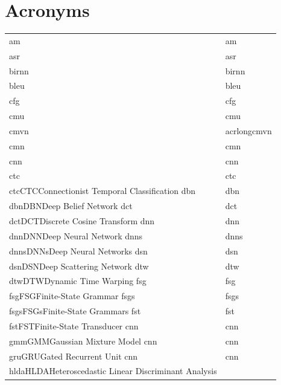\documentclass[12pt,twoside]{report}
\begin{document}
\listoffigures
 
\listoftables
{}
\listofalgorithms
\newpage
{}
\chapter*{Acronyms}
\begin{table}
  \label{tab:acronymns}
\begin{tabular}{ll}
\acrshort{am} & \acrlong{am}  \\
\acrshort{asr} & \acrlong{asr}\\
\acrshort{birnn} & \acrlong{birnn}\\
\acrshort{bleu} & \acrlong{bleu}\\
\acrshort{cfg} & \acrlong{cfg} \\
\acrshort{cmu} & \acrlong{cmu} \\
\acrshort{cmvn} & acrlong{cmvn} \\
\acrshort{cmn} & \acrlong{cmn} \\
\acrshort{cnn} & \acrlong{cnn} \\
\acrshort{ctc} & \acrlong{ctc} \\{ctc}{CTC}{Connectionist Temporal Classification}
\acrshort{dbn} & \acrlong{dbn} \\{dbn}{DBN}{Deep Belief Network}
\acrshort{dct} & \acrlong{dct} \\{dct}{DCT}{Discrete Cosine Transform}
\acrshort{dnn} & \acrlong{dnn} \\{dnn}{DNN}{Deep Neural Network}
\acrshort{dnns} & \acrlong{dnns} \\{dnns}{DNNs}{Deep Neural Networks}
\acrshort{dsn} & \acrlong{dsn} \\{dsn}{DSN}{Deep Scattering Network}
\acrshort{dtw} & \acrlong{dtw} \\{dtw}{DTW}{Dynamic Time Warping}
\acrshort{fsg} & \acrlong{fsg} \\{fsg}{FSG}{Finite-State Grammar}
\acrshort{fsgs} & \acrlong{fsgs} \\{fsgs}{FSGs}{Finite-State Grammars}
\acrshort{fst} & \acrlong{fst} \\{fst}{FST}{Finite-State Transducer}
\acrshort{cnn} & \acrlong{cnn} \\{gmm}{GMM}{Gaussian Mixture Model}
\acrshort{cnn} & \acrlong{cnn} \\{gru}{GRU}{Gated Recurrent Unit}
\acrshort{cnn} & \acrlong{cnn} \\{hlda}{HLDA}{Heteroscedastic Linear Discriminant Analysis}

\end{tabular}
\end{table}
\end{document}
